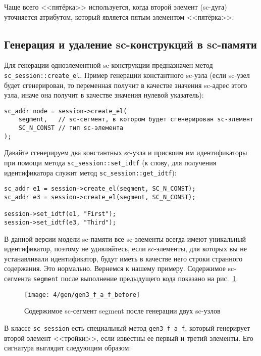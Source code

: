 Чаще всего <<пятёрка>> используется, когда второй элемент (sc-дуга)
уточняется атрибутом, который является пятым элементом <<пятёрка>>.

\subsection{Генерация и удаление sc-конструкций в sc-памяти}
\label{sec:libsc_gen_erase}

Для генерации одноэлементной sc-конструкции предназначен метод
\lstinline|sc_session::create_el|. Пример генерации константного
sc-узла (если sc-узел будет сгенерирован, то переменная получит в
качестве значения sc-адрес этого узла, иначе она получит в качестве
значения нулевой указатель):

\begin{lstlisting}[texcl]
sc_addr node = session->create_el(
    segment,   // sc-сегмент, в котором будет сгенерирован sc-элемент
    SC_N_CONST // тип sc-элемента
);
\end{lstlisting}

Давайте сгенерируем два константных sc-узла и присвоим им
идентификаторы при помощи метода \lstinline|sc_session::set_idtf| (к
слову, для получения идентификатора служит метод
\lstinline|sc_session::get_idtf|):

\begin{lstlisting}[texcl]
sc_addr e1 = session->create_el(segment, SC_N_CONST);
sc_addr e3 = session->create_el(segment, SC_N_CONST);

session->set_idtf(e1, "First");
session->set_idtf(e3, "Third");
\end{lstlisting}

В данной версии модели sc-памяти все sc-элементы всегда имеют
уникальный идентификатор, поэтому не удивляйтесь, если sc-элементы,
для которых вы не устанавливали идентификатор, будут иметь в качестве
него строки странного содержания. Это нормально. Вернемся к нашему
примеру. Содержимое sc-сегмента \lstinline|segment| после выполнение
предыдущего кода показано на рис.~\ref{fig:gen3_f_a_f_before}.

\begin{figure}
  \centering
  \texttt{[image: 4/gen/gen3\_f\_a\_f\_before]}
  \caption{Содержимое sc-сегмент segment после генерации двух sc-узлов}
  \label{fig:gen3_f_a_f_before}
\end{figure}

В классе \lstinline|sc_session| есть специальный метод
\lstinline|gen3_f_a_f|, который генерирует второй элемент <<тройки>>,
если известны ее первый и третий элементы. Его сигнатура выглядит
следующим образом:

